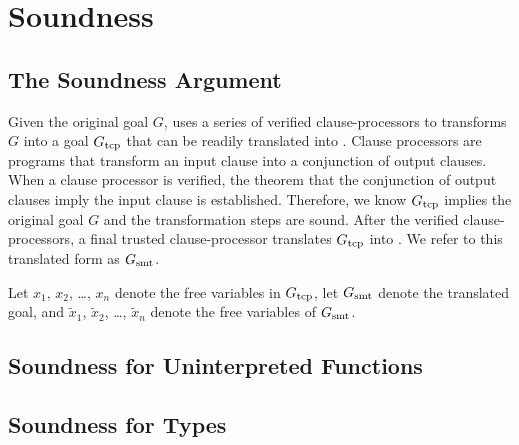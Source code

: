 \chapter{Soundness}
\label{ch:Soundness}

\section{The Soundness Argument}\label{sec:SoundArg}
Given the original goal $G$, \smtlink{} uses a series of verified
clause-processors to transforms $G$ into a goal $G_{\mathrm{tcp}}$ that can be readily
translated into \zthree{}.
Clause processors are programs that transform an input clause into a conjunction
of output clauses.
When a clause processor is verified, the theorem that the conjunction of output
clauses imply the input clause is established.
Therefore, we know $G_{\mathrm{tcp}}$ implies the original goal $G$ and the transformation
steps are sound.
After the verified clause-processors, a final trusted clause-processor
translates $G_{\mathrm{tcp}}$ into \zthree{}. We refer to this translated form as $G_{\mathrm{smt}}$.

Let $x_1$, $x_2$, \ldots, $x_n$ denote the free variables in $G_{\mathrm{tcp}}$,
let $G_{\mathrm{smt}}$ denote the translated goal,
and $\tilde{x}_1$, $\tilde{x}_2$, \ldots, $\tilde{x}_n$ denote
the free variables of $G_{\mathrm{smt}}$.



\section{Soundness for Uninterpreted Functions}\label{sec:SoundUninterpreted}

\section{Soundness for Types}\label{sec:SoundType}

\endinput

